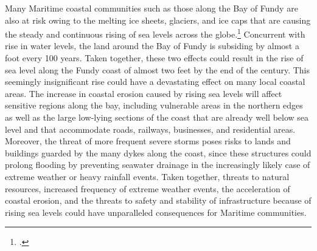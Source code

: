 Many Maritime coastal communities such as those along the Bay of Fundy are also at risk owing to the melting ice sheets, glaciers, and ice caps that are causing the steady and continuous rising of sea levels across the globe.\footcite[][]{PercyRisingTide}
Concurrent with rise in water levels, the land around the Bay of Fundy is subsiding by almost a foot every 100 years.
Taken together, these two effects could result in the rise of sea level along the Fundy coast of almost two feet by the end of the century.
This seemingly insignificant rise could have a devastating effect on many local coastal areas.
The increase in coastal erosion caused by rising sea levels will affect sensitive regions along the bay, including vulnerable areas in the northern edges as well as the large low-lying sections of the coast that are already well below sea level and that accommodate roads, railways, businesses, and residential areas. 
Moreover, the threat of more frequent severe storms poses risks to lands and buildings guarded by the many dykes along the coast, since these structures could prolong flooding by preventing seawater drainage in the increasingly likely case of extreme weather or heavy rainfall events. 
Taken together, threats to natural resources, increased frequency of extreme weather events, the acceleration of coastal erosion, and the threats to safety and stability of infrastructure because of rising sea levels could have unparalleled consequences for Maritime communities. 



